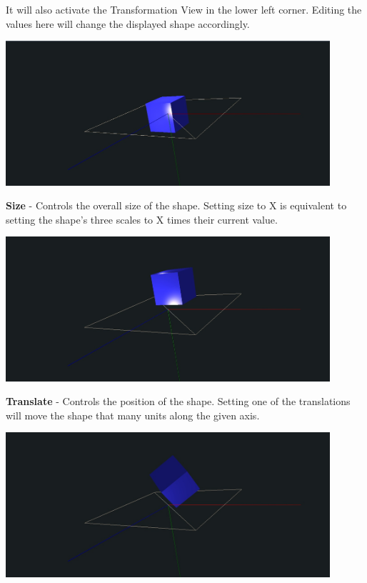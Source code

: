 \documentclass{article}
\begin{document}
It will also activate the Transformation View in the lower left corner. Editing
the values here will change the displayed shape accordingly. 

\begin{center}
\includegraphics[width=12cm]{images/GeometryCubeSize.jpg}
\end{center}

\textbf{Size} - Controls the overall size of the shape. Setting size to X is
equivalent to setting the shape's three scales to X times their current value.

\begin{center}
\includegraphics[width=12cm]{images/GeometryCubeTranslate.jpg}
\end{center}

\textbf{Translate} - Controls the position of the shape. Setting one of the
translations will move the shape that many units along the given axis.

\begin{center}
\includegraphics[width=12cm]{images/GeometryCubeRotate.jpg}
\end{center}
\end{document}
